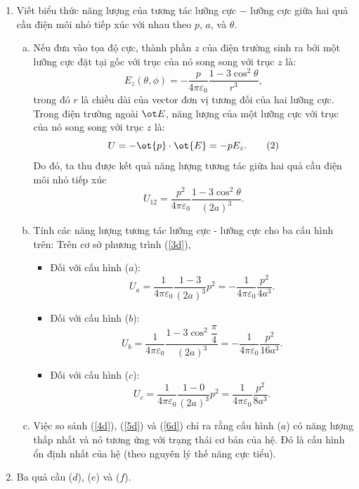 \begin{loigiai}
\begin{enumerate}[1)]                           
    \item Viết biểu thức năng lượng của tương tác lưỡng cực $-$ lưỡng cực giữa hai quả cầu điện môi nhỏ tiếp xúc với nhau theo $p$, $a$, và $\theta$.
    \begin{enumerate}[a)]
   \item Nếu đưa vào tọa độ cực, thành phần $z$ của điện trường sinh ra bởi một lưỡng cực đặt tại gốc với trục của nó song song với trục $z$ là:
    \[E_{z}(\theta, \phi)=-\dfrac{p}{4 \pi \varepsilon_{0}} \dfrac{1-3 \cos ^{2} \theta}{r^{3}}, \tag{1} \]
    trong đó $r$ là chiều dài của vector đơn vị tương đối của hai lưỡng cực. Trong điện trường ngoài $\ot E$, năng lượng của một lưỡng cực với trục của nó song song với trục $z$ là:
    \[U= -\ot{p}\cdot \ot{E}=-pE_{z}. \tag{2}\]
    Do đó, ta thu được kết quả năng lượng tương tác giữa hai quả cầu điện môi nhỏ tiếp xúc
    \[U_{12}=\dfrac{p^{2}}{4 \pi \varepsilon_{0}} \dfrac{1-3 \cos ^{2} \theta}{(2 a)^{3}}. \tag{3} \label{3d}\] 
    \item Tính các năng lượng tương tác lưỡng cực - lưỡng cực cho ba cấu hình trên:
    Trên cơ sở phương trình (\ref{3d}),
    \begin{itemize}
        \item Đối với cấu hình ($a$):
    \[U_{a}=\dfrac{1}{4 \pi \varepsilon_{0}} \dfrac{1-3}{(2 a)^{3}} p^{2}=-\dfrac{1}{4 \pi \varepsilon_{0}} \dfrac{p^{2}}{4 a^{3}}. \tag{4} \label{4d}\]
        \item  Đối với cấu hình ($b$): 
    \[U_{b}=\dfrac{1}{4 \pi \varepsilon_{0}} \dfrac{1-3 \cos ^{2} \dfrac{\pi}{4}}{(2 a)^{3}}=-\dfrac{1}{4 \pi \varepsilon_{0}} \dfrac{p^{2}}{16 a^{3}}. \tag{5} \label{5d} \]
        \item Đối với cấu hình ($c$):
    \[U_{c}=\dfrac{1}{4 \pi \varepsilon_{0}} \dfrac{1-0}{(2 a)^{3}} p^{2}=\dfrac{1}{4 \pi \varepsilon_{0}} \dfrac{p^{2}}{8 a^{3}}. \tag{6} \label{6d}\]
    \end{itemize}
    \item Việc so sánh (\ref{4d}), (\ref{5d}) và (\ref{6d}) chỉ ra rằng cấu hình ($a$) có năng lượng thấp nhất và nó tương ứng với trạng thái cơ bản của hệ. Đó là cấu hình ổn định nhất của hệ (theo nguyên lý thế năng cực tiểu).
    \end{enumerate}
    \item Ba quả cầu ($d$), ($e$) và ($f$).
   \begin{enumerate}[a)]

\end{enumerate}
\end{enumerate}
\end{loigiai}
